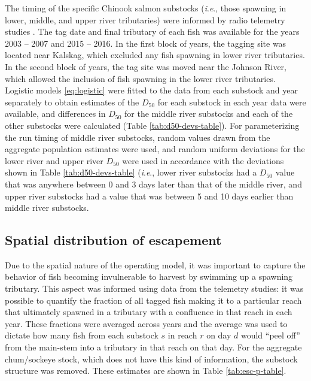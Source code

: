 \documentclass[12pt,]{book}
\theoremstyle{definition}
\theoremstyle{definition}
\theoremstyle{definition}
\theoremstyle{remark}
\begin{document}
\noindent
The timing of the specific Chinook salmon substocks (\emph{i}.\emph{e}.,
those spawning in lower, middle, and upper river tributaries) were
informed by radio telemetry studies
\citep{stuby-2007, smith-liller-2017a, smith-liller-2017b}. The tag date
and final tributary of each fish was available for the years 2003 --
2007 and 2015 -- 2016. In the first block of years, the tagging site was
located near Kalskag, which excluded any fish spawning in lower river
tributaries. In the second block of years, the tag site was moved near
the Johnson River, which allowed the inclusion of fish spawning in the
lower river tributaries. Logistic models \eqref{eq:logistic} were fitted
to the data from each substock and year separately to obtain estimates
of the \(D_{50}\) for each substock in each year data were available,
and differences in \(D_{50}\) for the middle river substocks and each of
the other substocks were calculated (Table \ref{tab:d50-devs-table}).
For parameterizing the run timing of middle river substocks, random
values drawn from the aggregate population estimates were used, and
random uniform deviations for the lower river and upper river \(D_{50}\)
were used in accordance with the deviations shown in Table
\ref{tab:d50-devs-table} (\emph{i}.\emph{e}., lower river substocks had
a \(D_{50}\) value that was anywhere between 0 and 3 days later than
that of the middle river, and upper river substocks had a value that was
between 5 and 10 days earlier than middle river substocks.

\subsection{Spatial distribution of escapement}\label{calc-esc-p}

\noindent
Due to the spatial nature of the operating model, it was important to
capture the behavior of fish becoming invulnerable to harvest by
swimming up a spawning tributary. This aspect was informed using data
from the telemetry studies: it was possible to quantify the fraction of
all tagged fish making it to a particular reach that ultimately spawned
in a tributary with a confluence in that reach in each year. These
fractions were averaged across years and the average was used to dictate
how many fish from each substock \(s\) in reach \(r\) on day \(d\) would
``peel off'' from the main-stem into a tributary in that reach on that
day. For the aggregate chum/sockeye stock, which does not have this kind
of information, the substock structure was removed. These estimates are
shown in Table \ref{tab:esc-p-table}.
\end{document}

